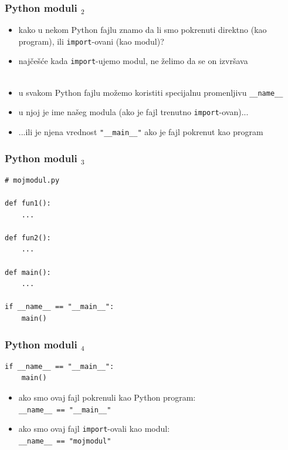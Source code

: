 \documentclass[utf8,compress]{beamer}
\begin{document}
\begin{frame}[fragile]
  \frametitle{Python moduli $_2$}
  \begin{itemize}
    \item kako u nekom Python fajlu znamo da li smo pokrenuti direktno (kao program), ili \texttt{import}-ovani (kao modul)?
    \item najčešće kada \texttt{import}-ujemo modul, ne želimo da se on izvršava \\ \ \\
    \item u svakom Python fajlu možemo koristiti specijalnu promenljivu \texttt{\_\_name\_\_}
    \item u njoj je ime našeg modula (ako je fajl trenutno \texttt{import}-ovan)...
    \item ...ili je njena vrednost \texttt{"\_\_main\_\_"} ako je fajl pokrenut kao program
  \end{itemize}
\end{frame}

\begin{frame}[fragile]
  \frametitle{Python moduli $_3$}
\begin{verbatim}
# mojmodul.py

def fun1():
    ...

def fun2():
    ...

def main():
    ...

if __name__ == "__main__":
    main()
\end{verbatim}
\end{frame}

\begin{frame}[fragile]
  \frametitle{Python moduli $_4$}
\begin{verbatim}
if __name__ == "__main__":
    main()
\end{verbatim}
  \begin{itemize}
    \item ako smo ovaj fajl pokrenuli kao Python program: \\
    \texttt{\_\_name\_\_ == "\_\_main\_\_"}
    \item ako smo ovaj fajl \texttt{import}-ovali kao modul: \\
    \texttt{\_\_name\_\_ == "mojmodul"}
  \end{itemize}
\end{frame}
\end{document}
